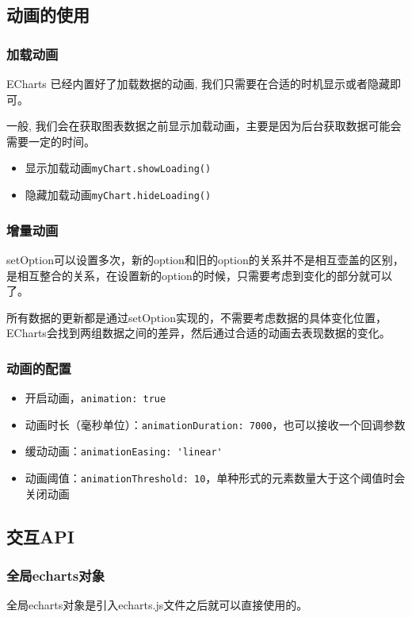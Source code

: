 \subsection{动画的使用}

\subsubsection{加载动画}
ECharts 已经内置好了加载数据的动画, 我们只需要在合适的时机显示或者隐藏即可。

一般, 我们会在获取图表数据之前显示加载动画，主要是因为后台获取数据可能会需要一定的时间。
\begin{itemize}
    \item 显示加载动画\verb|myChart.showLoading()|
    \item 隐藏加载动画\verb|myChart.hideLoading()|
\end{itemize}

\subsubsection{增量动画} setOption可以设置多次，新的option和旧的option的关系并不是相互壶盖的区别，是相互整合的关系，在设置新的option的时候，只需要考虑到变化的部分就可以了。

所有数据的更新都是通过setOption实现的，不需要考虑数据的具体变化位置，ECharts会找到两组数据之间的差异，然后通过合适的动画去表现数据的变化。
\subsubsection{动画的配置} 
\begin{itemize}
    \item 开启动画，\verb|animation: true|
    \item 动画时长（毫秒单位）：\verb|animationDuration: 7000|，也可以接收一个回调参数
    \item 缓动动画：\verb|animationEasing: 'linear'|
    \item 动画阈值：\verb|animationThreshold: 10|，单种形式的元素数量大于这个阈值时会关闭动画
\end{itemize}
\subsection{交互API}
\subsubsection{全局echarts对象}
全局echarts对象是引入echarts.js文件之后就可以直接使用的。

